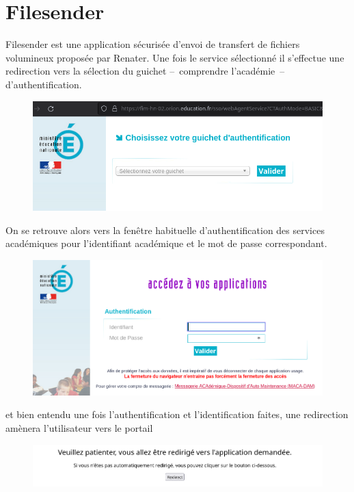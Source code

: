 \chapter{Filesender}
Filesender est une application sécurisée d'envoi de transfert de fichiers volumineux proposée par Renater. 
Une fois le service sélectionné il s'effectue une redirection vers la sélection du guichet --~comprendre l'académie~-- d'authentification.
\begin{figure}
	\centering
	\includegraphics{./Captures/filesender.choix.guichet-academique.png}
\end{figure}
On se retrouve alors vers la fenêtre habituelle d'authentification des services académiques pour l'identifiant académique et le mot de passe correspondant.
\begin{figure}
	\centering
	\includegraphics{./Captures/authentification.academique.png}
	\caption{}
\end{figure}
et bien entendu une fois l'authentification et l'identification faites, une redirection amènera l'utilisateur vers le portail
\begin{figure}
	\centering
	\includegraphics{./Captures/authentification.academique.redirection.png}
\end{figure}
